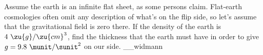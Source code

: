 Assume the earth is an infinite flat sheet, as some persons claim.
Flat-earth cosmologies often omit any description of what's on the
flip side, so let's assume that the gravitational field is zero
there. If the density of the earth is $4\ \zu{g}/\zu{cm}^3$,
find the thickness that the earth must have in order to give
$g=9.8\ \munit/\sunit^2$ on our side.
__widmann
\answercheck
